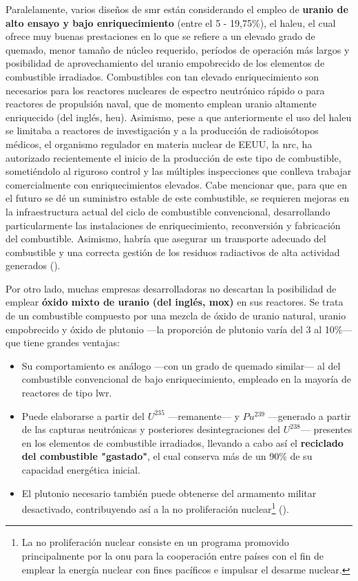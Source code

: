 Paralelamente, varios diseños de \acrshort{smr} están considerando el empleo de \textbf{uranio de alto ensayo y bajo enriquecimiento} (entre el 5 - 19,75\%), el \acrfull{haleu}, el cual ofrece muy buenas prestaciones en lo que se refiere a un elevado grado de quemado, menor tamaño de núcleo requerido, períodos de operación más largos y posibilidad de aprovechamiento del uranio empobrecido de los elementos de combustible irradiados. Combustibles con tan elevado enriquecimiento son necesarios para los reactores nucleares de espectro neutrónico rápido o para reactores de propulsión naval, que de momento emplean uranio altamente enriquecido (del inglés, \acrshort{heu}). Asimismo, pese a que anteriormente el uso del \acrshort{haleu} se limitaba a reactores de investigación y a la producción de radioisótopos médicos, el organismo regulador en materia nuclear de EEUU, la \acrfull{nrc}, ha autorizado recientemente el inicio de la producción de este tipo de combustible, sometiéndolo al riguroso control y las múltiples inspecciones que conlleva trabajar comercialmente con enriquecimientos elevados.  Cabe mencionar que, para que en el futuro se dé un suministro estable de este combustible, se requieren mejoras en la infraestructura actual del ciclo de combustible convencional, desarrollando particularmente las instalaciones de enriquecimiento, reconversión y fabricación del combustible. Asimismo, habría que asegurar un transporte adecuado del combustible y una correcta gestión de los residuos radiactivos de alta actividad generados (\cite{nrc_haleu}). 

Por otro lado, muchas empresas desarrolladoras no descartan la posibilidad de emplear \textbf{óxido mixto de uranio (del inglés, \acrshort{mox})} en sus reactores. Se trata de un combustible compuesto por una mezcla de óxido de uranio natural, uranio empobrecido y óxido de plutonio ---la proporción de plutonio varía del 3 al 10\%--- que tiene grandes ventajas:

\begin{itemize}
  \item Su comportamiento es análogo ---con un grado de quemado similar--- al del combustible convencional de bajo enriquecimiento, empleado en la mayoría de reactores de tipo \acrshort{lwr}.
  \item Puede elaborarse a partir del $U^{235}$ ---remanente--- y $Pu^{239}$ ---generado a partir de las capturas neutrónicas y posteriores desintegraciones del $U^{238}$--- presentes en los elementos de combustible irradiados, llevando a cabo así el \textbf{reciclado del combustible "gastado"}, el cual conserva más de un 90\% de su capacidad energética inicial. 
  \item El plutonio necesario también puede obtenerse del armamento militar desactivado, contribuyendo así a la \gls{no prolifera}ción nuclear\footnote{La no proliferación nuclear consiste en un programa promovido principalmente por la \acrshort{onu} para la cooperación entre países con el fin de emplear la energía nuclear con fines pacíficos e impulsar el desarme nuclear.} (\cite{wna_mox}).
\end{itemize}

